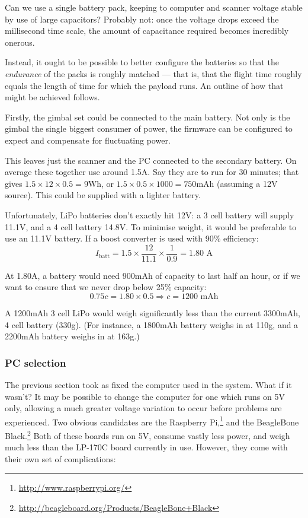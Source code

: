 \documentclass[12pt,oneside,a4paper,draft]{book}
\begin{document}
Can we use a single battery pack, keeping to computer and scanner
voltage stable by use of large capacitors? Probably not: once the
voltage drops exceed the millisecond time scale, the amount of
capacitance required becomes incredibly onerous.

Instead, it ought to be possible to better configure the batteries so
that the \emph{endurance} of the packs is roughly matched --- that is,
that the flight time roughly equals the length of time for which the
payload runs. An outline of how that might be achieved follows.

Firstly, the gimbal set could be connected to the main battery. Not
only is the gimbal the single biggest consumer of power, the firmware
can be configured to expect and compensate for fluctuating power.

This leaves just the scanner and the PC connected to the secondary
battery. On average these together use around 1.5A.  Say they are to
run for 30 minutes; that gives $1.5 \times 12 \times 0.5 = 9$Wh, or
$1.5 \times 0.5 \times 1000 = 750$mAh (assuming a 12V source). This
could be supplied with a lighter battery.

Unfortunately, LiPo batteries don't exactly hit 12V: a 3 cell battery
will supply 11.1V, and a 4 cell battery 14.8V. To minimise weight, it
would be preferable to use an 11.1V battery. If a boost converter is
used with 90\% efficiency:
\begin{equation}
  \label{eq:2}
  I_{\text{batt}} = 1.5 \times \frac{12}{11.1} \times \frac{1}{0.9} =
  1.80 \text{ A}
\end{equation}

At 1.80A, a battery would need 900mAh of capacity to last half an
hour, or if we want to ensure that we never drop below 25\% capacity:
\begin{equation}
  \label{eq:3}
  0.75c = 1.80 \times 0.5 \Rightarrow c = 1200 \text{ mAh}
\end{equation}

A 1200mAh 3 cell LiPo would weigh significantly less than the current
3300mAh, 4 cell battery (330g). (For instance, a 1800mAh battery weighs
in at 110g, and a 2200mAh battery weighs in at 163g.)

\subsubsection{PC selection}
\label{sec:electr-gener}

The previous section took as fixed the computer used in the
system. What if it wasn't? It may be possible to change the computer
for one which runs on 5V only, allowing a much greater voltage
variation to occur before problems are experienced. Two obvious
candidates are the Raspberry
Pi,\footnote{\url{http://www.raspberrypi.org/}} and the BeagleBone
Black.\footnote{\url{http://beagleboard.org/Products/BeagleBone+Black}}
Both of these boards run on 5V, consume vastly less power, and weigh
much less than the LP-170C board currently in use. However, they come
with their own set of complications:
\end{document}
